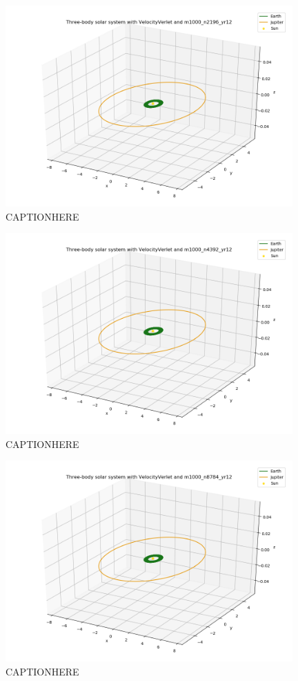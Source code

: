 \documentclass{article}
\begin{document}
    \begin{figure}[H]
        \centering
        \includegraphics[width = 11cm]{img/plot3D_S_E_J_V_m1000_n2196_yr12.png}
        \caption{CAPTIONHERE}
        \label{fig:plot3D_S_E_J_V_m1000_n2196_yr12}
    \end{figure}

    \begin{figure}[H]
        \centering
        \includegraphics[width = 11cm]{img/plot3D_S_E_J_V_m1000_n4392_yr12.png}
        \caption{CAPTIONHERE}
        \label{fig:plot3D_S_E_J_V_m1000_n4392_yr12}
    \end{figure}

    \begin{figure}[H]
        \centering
        \includegraphics[width = 11cm]{img/plot3D_S_E_J_V_m1000_n8784_yr12.png}
        \caption{CAPTIONHERE}
        \label{fig:plot3D_S_E_J_V_m1000_n8784_yr12}
    \end{figure}
\end{document}
